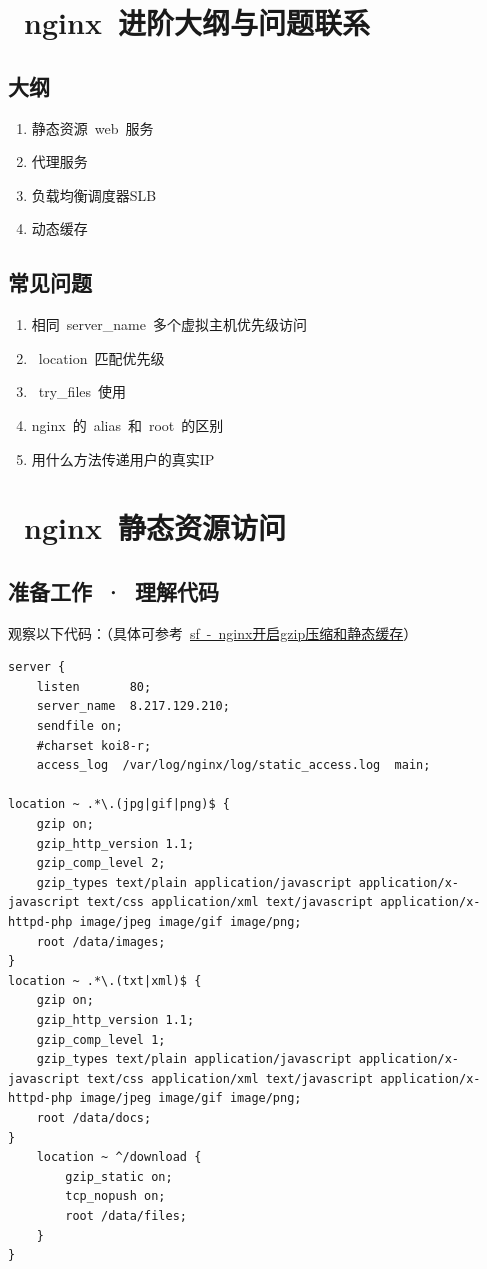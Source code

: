 \documentclass[12pt, a4paper]{article} %
\begin{document}
\begin{CJK*}{UTF8}{gbsn}
\clearpage
\section{~nginx~进阶大纲与问题联系}
\subsection{大纲}
\begin{enumerate}
    \item 静态资源~web~服务
    \item 代理服务
    \item 负载均衡调度器SLB
    \item 动态缓存
\end{enumerate}
\subsection{常见问题}
\begin{enumerate}
    \item 相同~server\_name~多个虚拟主机优先级访问
    \item ~location~匹配优先级
    \item ~try\_files~使用
    \item nginx~的~alias~和~root~的区别
    \item 用什么方法传递用户的真实IP
\end{enumerate}


\clearpage
\section{~nginx~静态资源访问}

\subsection{准备工作~·~理解代码}

观察以下代码：（具体可参考~\href{https://segmentfault.com/a/1190000020978410}{sf~-~nginx开启gzip压缩和静态缓存}）
\begin{lstlisting}
server {
    listen       80;
    server_name  8.217.129.210;
    sendfile on;
    #charset koi8-r;
    access_log  /var/log/nginx/log/static_access.log  main;

location ~ .*\.(jpg|gif|png)$ {
    gzip on;
    gzip_http_version 1.1;
    gzip_comp_level 2;
    gzip_types text/plain application/javascript application/x-javascript text/css application/xml text/javascript application/x-httpd-php image/jpeg image/gif image/png;
    root /data/images;
}
location ~ .*\.(txt|xml)$ {
    gzip on;
    gzip_http_version 1.1;
    gzip_comp_level 1;
    gzip_types text/plain application/javascript application/x-javascript text/css application/xml text/javascript application/x-httpd-php image/jpeg image/gif image/png;
    root /data/docs;
}
    location ~ ^/download {
        gzip_static on;
        tcp_nopush on;
        root /data/files;
    }
}
\end{lstlisting}


\end{CJK*}
\end{document}
